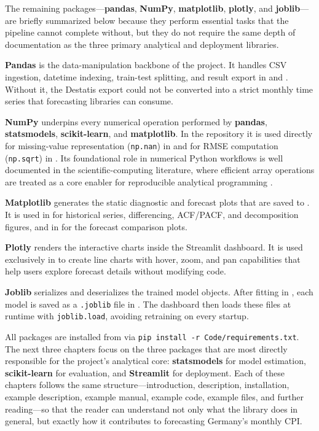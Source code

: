 The remaining packages---\textbf{pandas}, \textbf{NumPy}, \textbf{matplotlib}, \textbf{plotly}, and \textbf{joblib}---are briefly summarized below because they perform essential tasks that the pipeline cannot complete without, but they do not require the same depth of documentation as the three primary analytical and deployment libraries.

\textbf{Pandas} is the data-manipulation backbone of the project. It handles CSV ingestion, datetime indexing, train-test splitting, and result export in  and . Without it, the Destatis export could not be converted into a strict monthly time series that forecasting libraries can consume.

\textbf{NumPy} underpins every numerical operation performed by \textbf{pandas}, \textbf{statsmodels}, \textbf{scikit-learn}, and \textbf{matplotlib}. In the repository it is used directly for missing-value representation (\texttt{np.nan}) in  and for RMSE computation (\texttt{np.sqrt}) in . Its foundational role in numerical Python workflows is well documented in the scientific-computing literature, where efficient array operations are treated as a core enabler for reproducible analytical programming \cite{Harris:2020}.

\textbf{Matplotlib} generates the static diagnostic and forecast plots that are saved to . It is used in  for historical series, differencing, ACF/PACF, and decomposition figures, and in  for the forecast comparison plots.

\textbf{Plotly} renders the interactive charts inside the Streamlit dashboard. It is used exclusively in  to create line charts with hover, zoom, and pan capabilities that help users explore forecast details without modifying code.

\textbf{Joblib} serializes and deserializes the trained model objects. After fitting in , each model is saved as a \texttt{.joblib} file in . The dashboard then loads these files at runtime with \texttt{joblib.load}, avoiding retraining on every startup.

All packages are installed from  via \texttt{pip install -r Code/requirements.txt}. The next three chapters focus on the three packages that are most directly responsible for the project's analytical core: \textbf{statsmodels} for model estimation, \textbf{scikit-learn} for evaluation, and \textbf{Streamlit} for deployment. Each of these chapters follows the same structure---introduction, description, installation, example description, example manual, example code, example files, and further reading---so that the reader can understand not only what the library does in general, but exactly how it contributes to forecasting Germany's monthly CPI.
